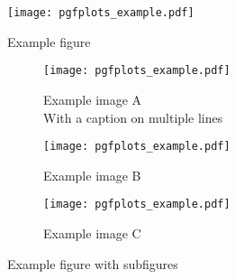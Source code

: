 \documentclass{article}
\begin{document}
\begin{figure}
    \centering
    \texttt{[image: pgfplots\_example.pdf]}
    \caption{Example figure}
    \label{fig:example}
\end{figure}

\begin{figure}
    \centering
    \captionsetup[subfigure]{justification=centering}
    \begin{subfigure}[t]{0.3\textwidth}
        \centering
        \texttt{[image: pgfplots\_example.pdf]}
        \caption{Example image A \\ With a caption on multiple lines}
        \label{fig:example A}
    \end{subfigure}
    \hfill
    \begin{subfigure}[t]{0.3\textwidth}
        \centering
        \texttt{[image: pgfplots\_example.pdf]}
        \caption{Example image B}
        \label{fig:example B}
    \end{subfigure}
    \hfill
    \begin{subfigure}[t]{0.3\textwidth}
        \centering
        \texttt{[image: pgfplots\_example.pdf]}
        \caption{Example image C}
        \label{fig:example C}
    \end{subfigure}
    \caption{Example figure with subfigures}
    \label{fig:example with subfigures}
\end{figure}
\end{document}
